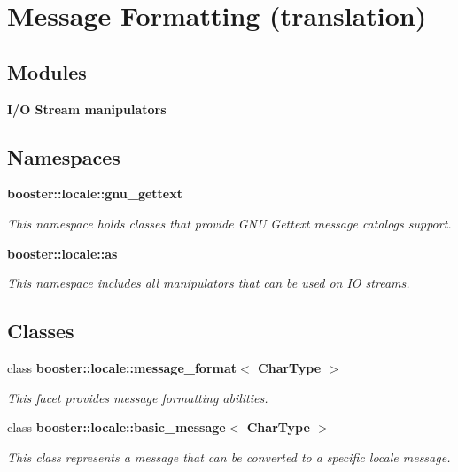 \section{Message Formatting (translation)}
\label{group__message}
\subsection*{Modules}
\begin{DoxyCompactItemize}
\item 
{\bf I/\-O Stream manipulators}
\end{DoxyCompactItemize}
\subsection*{Namespaces}
\begin{DoxyCompactItemize}
\item 
{\bf booster\-::locale\-::gnu\-\_\-gettext}
\begin{DoxyCompactList}\small\item\em This namespace holds classes that provide G\-N\-U Gettext message catalogs support. \end{DoxyCompactList}\item 
{\bf booster\-::locale\-::as}
\begin{DoxyCompactList}\small\item\em This namespace includes all manipulators that can be used on I\-O streams. \end{DoxyCompactList}\end{DoxyCompactItemize}
\subsection*{Classes}
\begin{DoxyCompactItemize}
\item 
class {\bf booster\-::locale\-::message\-\_\-format$<$ Char\-Type $>$}
\begin{DoxyCompactList}\small\item\em This facet provides message formatting abilities. \end{DoxyCompactList}\item 
class {\bf booster\-::locale\-::basic\-\_\-message$<$ Char\-Type $>$}
\begin{DoxyCompactList}\small\item\em This class represents a message that can be converted to a specific locale message. \end{DoxyCompactList}\end{DoxyCompactItemize}

